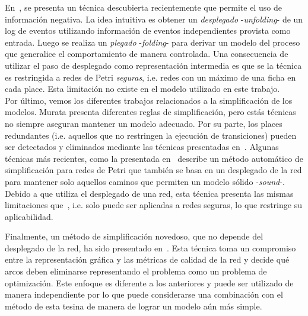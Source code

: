En~\cite{LeonRCHH15}, se presenta un técnica descubierta recientemente que permite el uso de información negativa.
La idea intuitiva es obtener un \textit{desplegado} -\textit{unfolding}- de un log de eventos utilizando 
información de eventos independientes provista como entrada. Luego se realiza un \textit{plegado} -\textit{folding}-
para derivar un modelo del proceso que generalice el comportamiento de manera controlada.
Una consecuencia de utilizar el paso de desplegado como representación intermedia es que se la técnica es restringida
a redes de Petri \textit{seguras}, i.e. redes con un máximo de una ficha en cada place. Esta limitación no existe
en el modelo utilizado en este trabajo.\\


Por último, vemos los diferentes trabajos relacionados a la simplificación de los modelos.
Murata presenta diferentes reglas de simplificación\cite{Murata89}, pero estás técnicas no siempre aseguran mantener
un modelo adecuado.
Por su parte, los places redundantes (i.e. aquellos que no restringen la ejecución de transiciones) pueden ser detectados
y eliminados mediante las técnicas presentadas en~\cite{ColomS89a}. 
Algunas técnicas más recientes, como la presentada en~\cite{FahlandA13} describe un método automático de simplificación para
redes de Petri que también se basa en un desplegado de la red para mantener solo aquellos caminos que permiten un modelo
sólido -\textit{sound}-. Debido a que utiliza el desplegado de una red, esta técnica presenta las mismas limitaciones
que~\cite{LeonRCHH15}, i.e. solo puede ser aplicadas a redes seguras, lo que restringe su aplicabilidad.

Finalmente, un método de simplificación novedoso, que no depende del desplegado de la red, ha sido presentado en~\cite{PedroCC15}.
Esta técnica toma un compromiso entre la representación gráfica y las métricas de calidad de la red y decide qué arcos
deben eliminarse representando el problema como un problema de optimización. Este enfoque es diferente a los anteriores
y puede ser utilizado de manera independiente por lo que puede considerarse una combinación con el método
de esta tesina de manera de lograr un modelo aún más simple.


